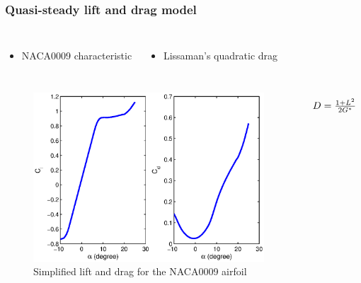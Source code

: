 \documentclass[compress]{beamer}
\begin{document}
\begin{frame}
  \frametitle{Quasi-steady lift and drag model}

  \begin{columns}[t]
    \begin{itemize}
      \item NACA0009 characteristic
    \end{itemize}
    \begin{itemize}
      \item Lissaman's quadratic drag
    \end{itemize}
  \end{columns}
  \begin{columns}
    \begin{figure}[h]
      \centering
      \includegraphics[width=1\textwidth]{./Figures/NACA0009_steady_map_Cl_Cd.eps}
      \caption{Simplified lift and drag for the NACA0009 airfoil}
    \end{figure}
    \begin{equation*}
      \begin{array}[c]{c}
	D=\frac{1+L^2}{2G^*}\\ \\ \\ \\ 
      \end{array}
    \end{equation*}
  \end{columns}
\end{frame}
\end{document}

